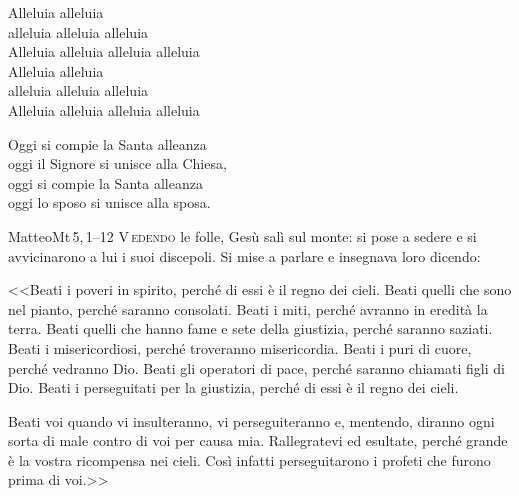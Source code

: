 \documentclass[11pt]{book}
\begin{document}
\settowidth{\versewidth}{Alleluia alleluia alleluia alleluia}
\begin{canzone}%
\begin{ritornello}
Alleluia alleluia\\
alleluia alleluia alleluia\\
Alleluia alleluia alleluia alleluia\\
Alleluia alleluia\\
alleluia alleluia alleluia\\
Alleluia alleluia alleluia alleluia
\end{ritornello}

Oggi si compie la Santa alleanza\\
oggi il Signore si unisce alla Chiesa,\\
oggi si compie la Santa alleanza\\
oggi lo sposo si unisce alla sposa.
\end{canzone}
\begin{vangelo}{Matteo}{Mt\,5,\,1--12}
\lettrine[nindent=-1pt,slope=-0.4em,lines=3]{V}{\,edendo} le folle, Gesù salì sul monte: si pose a sedere e si avvicinarono a lui i suoi discepoli. Si mise a parlare e insegnava loro dicendo:

<<Beati i poveri in spirito, perché di essi è il regno dei cieli.
Beati quelli che sono nel pianto, perché saranno consolati.
Beati i miti, perché avranno in eredità la terra.
Beati quelli che hanno fame e sete della giustizia, perché saranno saziati.
Beati i misericordiosi, perché troveranno misericordia.
Beati i puri di cuore, perché vedranno Dio.
Beati gli operatori di pace, perché saranno chiamati figli di Dio.
Beati i perseguitati per la giustizia, perché di essi è il regno dei cieli.

Beati voi quando vi insulteranno, vi perseguiteranno e, mentendo, diranno ogni sorta di male contro di voi per causa mia. Rallegratevi ed esultate, perché grande è la vostra ricompensa nei cieli. Così infatti perseguitarono i profeti che furono prima di voi.>>
\end{vangelo}
\matrintro
\medskip

\matrpre
\medskip

\consintro
\medskip

\promesse
\medskip

\preghpost


\benedizioneanelli

\medskip
\end{document}
